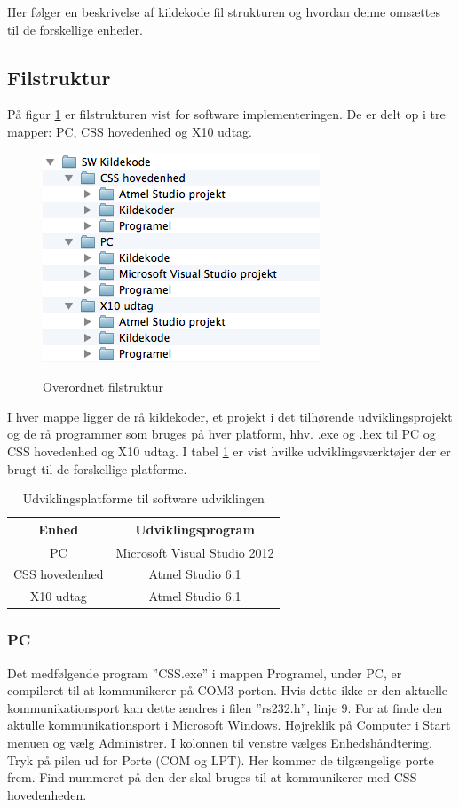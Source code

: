 Her følger en beskrivelse af kildekode fil strukturen og hvordan denne omsættes til de forskellige enheder.

\subsection{Filstruktur}
På figur \ref{fig:filstruktur1} er filstrukturen vist for software implementeringen.
De er delt op i tre mapper: PC, CSS hovedenhed og X10 udtag.

\begin{figure}[!htb]
     \centering
     { \includegraphics{billeder/Filstruktur1}}
     \caption{Overordnet filstruktur}
     \label{fig:filstruktur1}
\end{figure}

I hver mappe ligger de rå kildekoder, et projekt i det tilhørende udviklingsprojekt og de rå programmer som bruges på hver platform, hhv. .exe og .hex til PC og CSS hovedenhed og X10 udtag.
I tabel \ref{table:Udviklingsprogrammer} er vist hvilke udviklingsværktøjer der er brugt til de forskellige platforme.

\begin{table}[htb]
	\caption{Udviklingsplatforme til software udviklingen}
	\centering
	\begin{tabular}{|c|c|}
		\hline 
		\textbf{Enhed} & \textbf{Udviklingsprogram} \\ 
		\hline 
		PC & Microsoft Visual Studio 2012 \\ 
		\hline 
		CSS hovedenhed & Atmel Studio 6.1 \\ 
		\hline 
		X10 udtag & Atmel Studio 6.1 \\ 
		\hline 
	\end{tabular} 
	\label{table:Udviklingsprogrammer}
\end{table}

\subsubsection{PC}
Det medfølgende program ''CSS.exe'' i mappen Programel, under PC, er compileret til at kommunikerer på COM3 porten. Hvis dette ikke er den aktuelle kommunikationsport kan dette ændres i filen ''rs232.h'', linje 9. For at finde den aktulle kommunikationsport i Microsoft Windows. Højreklik på Computer i Start menuen og vælg Administrer. I kolonnen til venstre vælges Enhedshåndtering. Tryk på pilen ud for Porte (COM og LPT). Her kommer de tilgængelige porte frem. Find nummeret på den der skal bruges til at kommunikerer med CSS hovedenheden.

